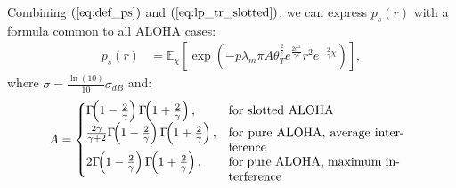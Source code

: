 Combining $(\ref{eq:def_ps})$ and $(\ref{eq:lp_tr_slotted})$, we can express $p_s(r)$ with a formula common to all ALOHA cases:
\begin{align}
\label{eq:def_ps_2}
p_{s}(r) & = \mathbb{E}_{\chi}\left[ \exp(-p \lambda_{m} \pi A \theta_{T}^{\frac{2}{\gamma}} e^{\frac{2\sigma^2}{\gamma^2}}  r^2 e^{-\frac{2}{\gamma}\chi}) \right],
\end{align}
where $\sigma = \frac{\ln(10)}{10}\sigma_{dB}$ and:
\[ \!\!\!\!A =
\begin{cases} 
\Gamma\!\!\left( 1-\frac{2}{\gamma}\right)\Gamma\!\!\left( 1+\frac{2}{\gamma}\right) ,  & \text{for slotted ALOHA }\\
\frac{2\gamma}{\gamma+2}\Gamma\!\!\left( 1-\frac{2}{\gamma}\right)\Gamma\!\!\left( 1+\frac{2}{\gamma}\right),  & \parbox[t]{.41\columnwidth}{for pure ALOHA, average interference }\\
2\Gamma\!\!\left( 1-\frac{2}{\gamma}\right)\Gamma\!\!\left( 1+\frac{2}{\gamma}\right),  & \parbox[t]{.4\columnwidth}{for pure ALOHA, maximum interference }
\end{cases}
\]


%
